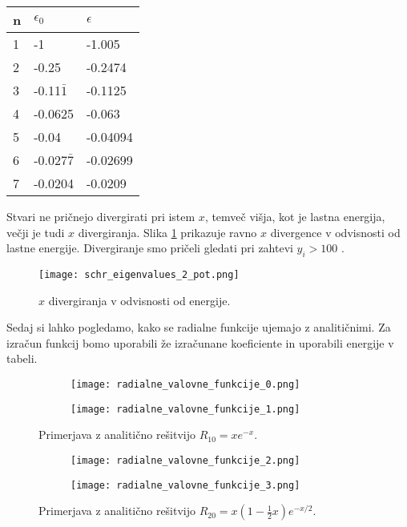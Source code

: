 \documentclass[12pt,a4paper]{article}
\begin{document}
\begin{table}[H]
\begin{center}
\begin{tabular}{|l|l|l|}
\hline
n & $\epsilon_0$    & $\epsilon$ \\ \hline
1 & -1              & -1.005     \\ \hline
2 & -0.25           & -0.2474    \\ \hline
3 & -0.11$\bar{1}$  & -0.1125    \\ \hline
4 & -0.0625         & -0.063     \\ \hline
5 & -0.04           & -0.04094   \\ \hline
6 & -0.027$\bar{7}$ & -0.02699   \\ \hline
7 & -0.0204         & -0.0209    \\ \hline
\end{tabular}
\end{center}
\end{table}


Stvari ne pričnejo divergirati pri istem $x$, temveč višja, kot je lastna energija, večji je tudi $x$ divergiranja. Slika \ref{fig:slika2} prikazuje ravno $x$ divergence v odvisnosti od lastne energije. Divergiranje smo pričeli gledati pri zahtevi $y_i > 100$ .

\begin{figure}[H]
    \centering
        \texttt{[image: schr\_eigenvalues\_2\_pot.png]}
    \caption{$x$ divergiranja v odvisnosti od energije.} \label{fig:slika2}
\end{figure}

Sedaj si lahko pogledamo, kako se radialne funkcije ujemajo z analitičnimi. Za izračun funkcij bomo uporabili že izračunane koeficiente in uporabili energije v tabeli.

\begin{figure}[H]
    \centering
    \begin{subfigure}[b]{0.49\textwidth}
        \texttt{[image: radialne\_valovne\_funkcije\_0.png]}
    \end{subfigure}
    \begin{subfigure}[b]{0.49\textwidth}
        \texttt{[image: radialne\_valovne\_funkcije\_1.png]}
    \end{subfigure}
    \caption{Primerjava z analitično rešitvijo $R_{10}=xe^{-x}$.} \label{fig:slika3}
\end{figure}


\begin{figure}[H]
    \centering
    \begin{subfigure}[b]{0.49\textwidth}
        \texttt{[image: radialne\_valovne\_funkcije\_2.png]}
    \end{subfigure}
    \begin{subfigure}[b]{0.49\textwidth}
        \texttt{[image: radialne\_valovne\_funkcije\_3.png]}
    \end{subfigure}
    \caption{Primerjava z analitično rešitvijo $R_{20}=x(1-\frac{1}{2}x)e^{-x/2}$.} \label{fig:slika4}
\end{figure}
\end{document}
